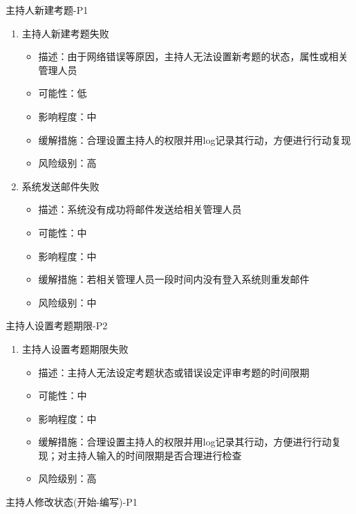 \documentclass[hyperref, a4paper]{ctexart}
\providecommand{\tightlist}{%
  \setlength{\itemsep}{0pt}\setlength{\parskip}{0pt}}
\begin{document}
主持人新建考题-P1

\begin{enumerate}
\def\labelenumi{\arabic{enumi}.}
\tightlist
\item
  主持人新建考题失败

  \begin{itemize}
  \tightlist
  \item
    描述：由于网络错误等原因，主持人无法设置新考题的状态，属性或相关管理人员
  \item
    可能性：低
  \item
    影响程度：中
  \item
    缓解措施：合理设置主持人的权限并用log记录其行动，方便进行行动复现
  \item
    风险级别：高
  \end{itemize}
\item
  系统发送邮件失败

  \begin{itemize}
  \tightlist
  \item
    描述：系统没有成功将邮件发送给相关管理人员
  \item
    可能性：中
  \item
    影响程度：中
  \item
    缓解措施：若相关管理人员一段时间内没有登入系统则重发邮件
  \item
    风险级别：中
  \end{itemize}
\end{enumerate}

主持人设置考题期限-P2

\begin{enumerate}
\def\labelenumi{\arabic{enumi}.}
\tightlist
\item
  主持人设置考题期限失败

  \begin{itemize}
  \tightlist
  \item
    描述：主持人无法设定考题状态或错误设定评审考题的时间限期
  \item
    可能性：中
  \item
    影响程度：中
  \item
    缓解措施：合理设置主持人的权限并用log记录其行动，方便进行行动复现；对主持人输入的时间限期是否合理进行检查
  \item
    风险级别：高
  \end{itemize}
\end{enumerate}

主持人修改状态(开始-编写)-P1
\end{document}
